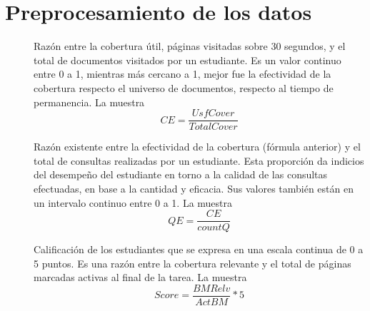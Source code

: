 \section{Preprocesamiento de los datos}

\begin{description}
	\item [] Razón entre la cobertura útil, páginas visitadas sobre 30 segundos, y el total de documentos visitados por un estudiante. Es un valor continuo entre 0 a 1, mientras más cercano a 1, mejor fue la efectividad de la cobertura respecto el universo de documentos, respecto al tiempo de permanencia. La  muestra     
	\begin{equation}
	CE = \frac{UsfCover}{TotalCover}
	\label{eq:CE}
	\end{equation}

	\item [] Razón existente entre la efectividad de la cobertura (fórmula anterior) y el total de consultas realizadas por un estudiante. Esta proporción da indicios del desempeño del estudiante en torno a la calidad de las consultas efectuadas, en base a la cantidad y eficacia. Sus valores también están en un intervalo continuo entre 0 a 1. La  muestra
	\begin{equation}
	QE = \frac{CE}{countQ}
	\label{eq:QE}
	\end{equation}

	\item [] Calificación de los estudiantes que se expresa en una escala continua de 0 a 5 puntos. Es una razón entre la cobertura relevante y el total de páginas marcadas activas al final de la tarea. La  muestra
	\begin{equation}
	Score = \frac{BMRelv}{ActBM} * 5
	\label{eq:score}
	\end{equation}
\end{description}